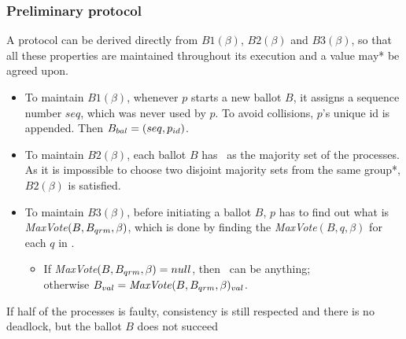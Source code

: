 \documentclass[10 pt]{beamer}
\begin{document}
\begin{frame}
\frametitle{Preliminary protocol}

A protocol can be derived directly from $B1(\beta)$, $B2(\beta)$ and $B3(\beta)$, so that all these properties are maintained throughout its execution and a value may* be agreed upon.

\begin{itemize}
  \item To maintain $B1(\beta)$, whenever $p$ starts a new ballot $B$, it assigns a sequence number $seq$, which was never used by $p$. To avoid collisions, $p$'s unique id is appended. Then $B_{bal} = (seq, p_{id})$.
  \item To maintain $B2(\beta)$, each ballot $B$ has \bqrm\ as the majority set of the processes. As it is impossible to choose two disjoint majority sets from the same group*, $B2(\beta)$ is satisfied.
  \item To maintain $B3(\beta)$, before initiating a ballot $B$, $p$ has to find out what is \textit{MaxVote}$(B, B_{qrm}, \beta)$, which is done by finding the \textit{MaxVote}$(B, q, \beta)$ for each $q$ in \bqrm.
  \begin{itemize}
    \item If \textit{MaxVote}$(B, B_{qrm}, \beta) = null$, then \bval\ can be anything;\\
    otherwise $B_{val} = \text{\textit{MaxVote}}(B, B_{qrm}, \beta)_{val}$.
  \end{itemize}
\end{itemize}

{\small * If half of the processes is faulty, consistency is still respected and there is no deadlock, but the ballot $B$ does not succeed}

\end{frame}
\end{document}
